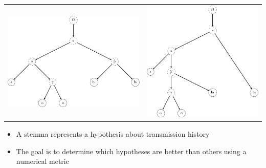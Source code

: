 \documentclass[10pt]{beamer}
\begin{document}
	\begin{frame}
		\begin{tabular}{p{} @{\hskip 0.2\textwidth} p{}}
			\vspace{0pt}\includegraphics[scale=0.4]{../img/gene-tree-rooted-site-1.pdf} & \vspace{0pt}\includegraphics[scale=0.4]{../img/gene-tree-rooted-site-2.pdf}
		\end{tabular}
		\begin{itemize}
			\item A stemma represents a hypothesis about transmission history
			\item The goal is to determine which hypotheses are better than others using a numerical metric
		\end{itemize}
	\end{frame}
\end{document}
